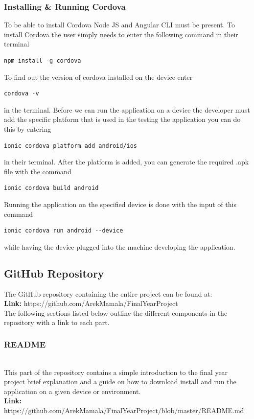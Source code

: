 \documentclass[a4paper,12pt]{report}
\begin{document}
\subsubsection{Installing \& Running Cordova }
To be able to install Cordova Node JS and Angular CLI must be present. To install Cordova the user simply needs to enter the following command in their terminal
\begin{verbatim}
npm install -g cordova
\end{verbatim}
To find out the version of cordova installed on the device enter 
\begin{verbatim}
cordova -v
\end{verbatim}
in the terminal.\cite{cordova}
Before we can run the application on a device the developer must add the specific platform that is used in the testing the application you can do this by entering
\begin{verbatim}
ionic cordova platform add android/ios
\end{verbatim}
in their terminal.
After the platform is added, you can generate the required .apk file with the command 
\begin{verbatim}
ionic cordova build android
\end{verbatim}

Running the application on the specified device is done with the input of this command 
\begin{verbatim}
ionic cordova run android --device   
\end{verbatim} while having the device plugged into the machine developing the application. \cite{cordovaRun}


\subsection{GitHub Repository}
The GitHub repository containing the entire project can be found at:\\ 
\textbf{Link:} https://github.com/ArekMamala/FinalYearProject\\
The following sections listed below outline the different components in the repository with a link to each part.

\subsubsection{README}\\
This part of the repository contains a simple introduction to the final year project brief explanation and a guide on how to download  install and run the application on a given device or environment.\\
\textbf{Link:} https://github.com/ArekMamala/FinalYearProject/blob/master/README.md
\end{document}
